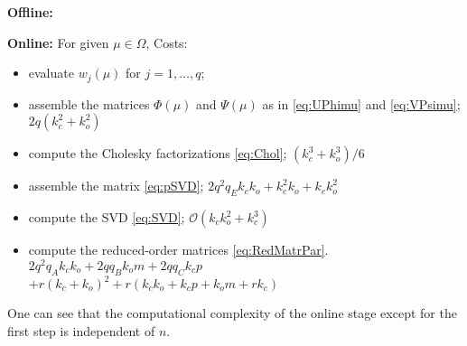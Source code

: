 {\bf Offline:} 
{\bf Online:} For given $\mu\in\Omega$, \hfill Costs:
\begin{itemize}
	\item evaluate $w_j(\mu)$ for $j=1,\ldots, q$;
	
	\item assemble the matrices $\Phi(\mu)$ and $\Psi(\mu)$ as in \eqref{eq:UPhimu} and \eqref{eq:VPsimu};
	\hfill $2q(k_c^2+k_o^2)$
	
	\item compute the Cholesky factorizations \eqref{eq:Chol}; \hfill $(k_c^3+k_o^3)/6$
	
	\item assemble the matrix \eqref{eq:pSVD}; \hfill $2q^2q_Ek_ck_o+k_c^2k_o+k_c k_o^2$
	
	\item compute the SVD \eqref{eq:SVD}; \hfill $\mathcal{O}(k_ck_o^2+k_c^3)$
	
	\item compute the reduced-order matrices \eqref{eq:RedMatrPar}.
	\hfill $2q^2 q_A k_c k_o +2q q_B k_o m+2q q_C k_c p$\\ \hspace*{6cm} $+r(k_c+k_o)^2+r(k_ck_o+k_cp+k_om+rk_c)$
	
\end{itemize}

One can see that the computational complexity of the online stage except for the first step is independent of $n$. 



